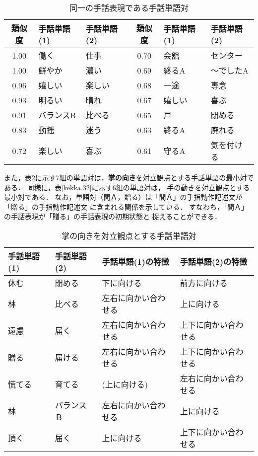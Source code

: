 \begin{table}[htbp]
\caption{同一の手話表現である手話単語対}
\label{kekka.2}
\begin{center}
\tabcolsep=3pt\footnotesize
\begin{tabular}{c|l|l||c|l|l}\hline
 類似度 & 手話単語(1)&手話単語(2)&類似度&手話単語(1)&手話単語(2)\\\hline\hline
    1.00 & 働く     &仕事   &  0.70 & 会舘     & センター  \\
    1.00 & 鮮やか   &濃い   &  0.69 & 終るA    & 〜でしたA  \\
    0.96 & 嬉しい   &楽しい &  0.68 & 一途     & 専念       \\
    0.93 & 明るい   &晴れ   &  0.67 & 嬉しい   & 喜ぶ       \\
    0.91 & バランスB&比べる &  0.65 & 戸       & 閉める     \\
    0.83 & 動揺     &迷う   &  0.63 & 終るA    & 廃れる     \\
    0.72 & 楽しい   &喜ぶ   &  0.61 & 守るA    & 気を付ける\\ \hline
\end{tabular}
\end{center}
\end{table}

また，表\ref{kekka.31}に示す7組の単語対は，{\bf 掌の向き}を対立観点とする手話単語の最小対である．
同様に，表\ref{kekka.32}に示す6組の単語対は， {\gt 手の動き}を対立観点とする
最小対である．
なお，単語対（間Ａ，贈る）は「間Ａ」の手指動作記述文が「贈る」の手指動作記述文
に含まれる関係を示している．
すなわち，「間Ａ」の手話表現が「贈る」の手話表現の初期状態と
捉えることができる．

\begin{table}[htbp]
\caption{掌の向きを対立観点とする手話単語対}
\label{kekka.31}
\begin{center}
\tabcolsep=3pt\footnotesize
\begin{tabular}{l|l||l|l}\hline
 手話単語(1)&手話単語(2)&手話単語(1)の特徴&手話単語(2)の特徴\\
\hline\hline
 休む & 閉める & 下に向ける & 前方に向ける\\
 林   & 比べる & 左右に向かい合わせる & 上に向ける\\
 遠慮 & 届く   & 左右に向かい合わせる & 上下に向かい合わせる\\
 贈る & 届ける & 左右に向かい合わせる & 上下に向かい合わせる\\
 慌てる & 育てる & (上に向ける) & 左右に向かい合わせる \\
 林   & バランスＢ & 左右に向かい合わせる & 上に向ける \\
 頂く & 届く & 上に向ける & 上下に向かい合わせる \\
 \hline
\end{tabular}
\end{center}
\end{table}

